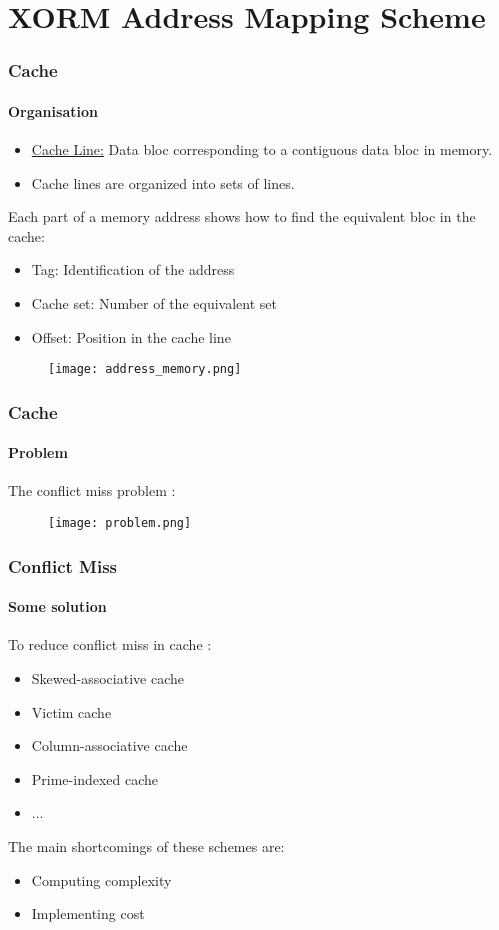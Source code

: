 \documentclass{beamer}
\begin{document}
\section{XORM Address Mapping Scheme}
\begin{frame}
\frametitle{Cache}
\framesubtitle{Organisation}
\begin{exampleblock}{}
\begin{itemize}
\item \underline{Cache Line:} Data bloc corresponding to a contiguous data bloc in memory.
\item Cache lines are organized into sets of lines.
\end{itemize}
\end{exampleblock}{}
Each part of a memory address shows how to find the equivalent bloc in the cache:
\begin{exampleblock}{}
\begin{itemize}
\item Tag: Identification of the address
\item Cache set: Number of the equivalent set
\item Offset: Position in the cache line
\end{itemize}
\end{exampleblock}{}
\begin{figure}
\texttt{[image: address\_memory.png]}
\end{figure}
\end{frame}

\begin{frame}
\frametitle{Cache}
\framesubtitle{Problem}
The conflict miss problem :
\begin{figure}
\texttt{[image: problem.png]}
\end{figure}
\end{frame}

\begin{frame}
\frametitle{Conflict Miss}
\framesubtitle{Some solution}
To reduce conflict miss in cache :
\begin{exampleblock}{}
\begin{itemize}
\item Skewed-associative cache
\item Victim cache
\item Column-associative cache
\item Prime-indexed cache
\item ...
\end{itemize}
\end{exampleblock}{}
\pause
The main shortcomings of these schemes are:
\begin{exampleblock}{}
\begin{itemize}
\item Computing complexity 
\item Implementing cost
\end{itemize}
\end{exampleblock}{}
\end{frame}
\end{document}
